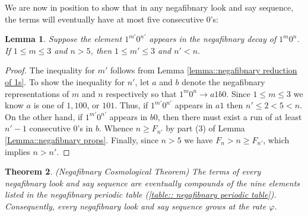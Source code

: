 \documentclass[reqno]{amsart}
\newtheorem{theorem}{Theorem}[section]
\newtheorem{lemma}[theorem]{Lemma}
\theoremstyle{definition}
\begin{document}
We are now in position to show that in any negafibnary look and say sequence, the terms will eventually have at most five consecutive 0's:

\begin{lemma}\label{lemma::negafibnary reduction of 0s}
    Suppose the element $1^{m'}0^{n'}$ appears in the negafibnary decay of $1^m0^n$. 
    If $1\leq m\leq 3$ and $n>5$, then $1\leq m'\leq 3$ and $n'<n$.
\end{lemma}

\begin{proof}
    The inequality for $m'$ follows from Lemma \ref{lemma::negafibnary reduction of 1s}. To show the inequality for $n'$, 
    let $a$ and $b$ denote the negafibnary representations of $m$ and $n$ respectively so that $1^m0^n\to a1b0$. Since $1\leq m\leq 3$ we know $a$ is one of $1, 100$, or $101$. Thus, if $1^{m'}0^{n'}$ appears in $a1$ then $n'\leq 2<5<n$. On the other hand, if $1^{m'}0^{n'}$ appears in $b0$, then there must exist a run of at least $n'-1$ consecutive 0's in $b$. Whence $n\geq F_{n'}$ by part (3) of Lemma \ref{Lemma::negafibnary props}. Finally, since $n>5$ we have $F_n>n\geq F_{n'}$, which implies $n>n'$.
\end{proof}


\begin{theorem}\label{theorem:: negafibnary cosmological theorem}
    (Negafibnary Cosmological Theorem)
    The terms of every negafibnary look and say sequence are eventually compounds of the nine elements listed in the negafibnary periodic table (\ref{table:: negafibnary periodic table}). Consequently, every negafibnary look and say sequence grows at the rate $\varphi$.  
\end{theorem}
\end{document}
